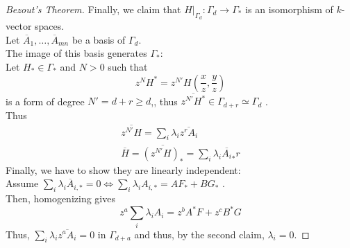 \documentclass[../main.tex]{subfiles}
\begin{document}
\begin{proof}[Bezout's Theorem]
Finally, we claim that $H|_{\Gamma_d} : \Gamma_d \to \Gamma_\ast$ is an isomorphism of $k$-vector spaces.\\
Let $\overline{A}_1,\ldots, \overline{A}_{mn} $ be a basis of $\Gamma_d$.\\
The image of this basis generates $\Gamma_\ast$:\\
Let $H_\ast\in \Gamma_\ast$ and $N>0$ such that
\[ 
z^{N}H^{\ast}= z^{N'} H( \frac{x}{z},\frac{y}{z}) 
\]
is a form of degree $N'= d+r \geq d$,, thus $ \overline{z^{N'} H^{\ast}}\in \Gamma_{d+r} \simeq \Gamma_d$ .\\
Thus
\begin{align*}
	\overline{ z^{N'} H } = \sum_{i}^{ } \lambda_i \overline{z^{r}A_i}\\
	\overline{H}= \overline{( z^{N'}H )_\ast}= \sum_{i}^{ } \lambda_i \overline{A_i}_\ast r
\end{align*}
Finally, we have to show they are linearly independent:\\
Assume $\sum_i \lambda_i \overline{A}_{i,\ast} =0 \iff \sum_i \lambda_i A_{i,\ast} = AF_\ast+ BG_\ast$ 	.\\
Then, homogenizing gives
\[ 
z^{a}\sum_i \lambda_i A_i = z^{b}A^{\ast}F + z^{c}B^{\ast}G
\]
Thus, $ \sum_{i}^{ }\lambda_i \overline{z^{a}A_i}=0$ in $\Gamma_{d+a} $ and thus, by the second claim, $\lambda_i =0$.
\end{proof}
\end{document}
